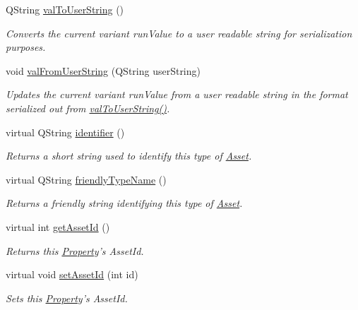 \begin{DoxyCompactItemize}
Q\-String \hyperlink{class_picto_1_1_property_ae4acea7db3b5c1ba4fcca8695a343fc0}{val\-To\-User\-String} ()
\begin{DoxyCompactList}\small\item\em Converts the current variant run\-Value to a user readable string for serialization purposes. \end{DoxyCompactList}\item 
void \hyperlink{class_picto_1_1_property_ac895b7d7c8a015e18deed4a71443b29a}{val\-From\-User\-String} (Q\-String user\-String)
\begin{DoxyCompactList}\small\item\em Updates the current variant run\-Value from a user readable string in the format serialized out from \hyperlink{class_picto_1_1_property_ae4acea7db3b5c1ba4fcca8695a343fc0}{val\-To\-User\-String()}. \end{DoxyCompactList}\item 
virtual Q\-String \hyperlink{class_picto_1_1_property_aee5beb60f1bc54fbaa2e69745450b476}{identifier} ()
\begin{DoxyCompactList}\small\item\em Returns a short string used to identify this type of \hyperlink{class_picto_1_1_asset}{Asset}. \end{DoxyCompactList}\item 
virtual Q\-String \hyperlink{class_picto_1_1_property_a81a1fcfb066be63fe887bafd530b959b}{friendly\-Type\-Name} ()
\begin{DoxyCompactList}\small\item\em Returns a friendly string identifying this type of \hyperlink{class_picto_1_1_asset}{Asset}. \end{DoxyCompactList}\item 
virtual int \hyperlink{class_picto_1_1_property_a9f1c515f9b65afe3da270b00b240ea41}{get\-Asset\-Id} ()
\begin{DoxyCompactList}\small\item\em Returns this \hyperlink{class_picto_1_1_property}{Property}'s Asset\-Id. \end{DoxyCompactList}\item 
virtual void \hyperlink{class_picto_1_1_property_a868534f67ff18012dbec0c922ed2e9a1}{set\-Asset\-Id} (int id)
\begin{DoxyCompactList}\small\item\em Sets this \hyperlink{class_picto_1_1_property}{Property}'s Asset\-Id. \end{DoxyCompactList}\end{DoxyCompactItemize}

